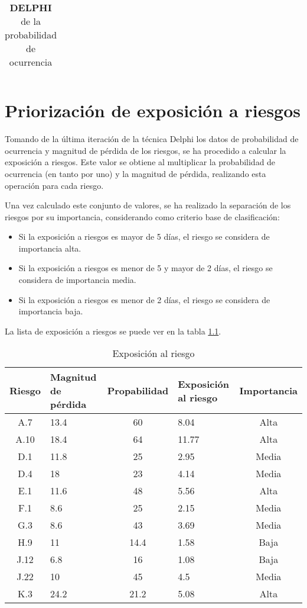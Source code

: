 \documentclass[11pt,a4paper,spanish,twoside]{report}
\begin{document}
\begin{table}[!h]
\begin{tabular}{|c|c||c|c|c|c|c||c|c|c||c|}
   \end{tabular}
  \caption{\textbf{DELPHI} de la probabilidad de ocurrencia}
  \label{Tab:DELPHIpro}
\end{table}


\chapter{Priorización de exposición a riesgos}
Tomando de la última iteración de la técnica Delphi los datos de probabilidad
de ocurrencia y magnitud de pérdida de los riesgos, se ha procedido a
calcular la exposición a riesgos. Este valor se obtiene al multiplicar la
probabilidad de ocurrencia (en tanto por uno) y la magnitud de pérdida,
realizando esta operación para cada riesgo.

Una vez calculado este conjunto de valores, se ha realizado la separación de
los riesgos por su importancia, considerando como criterio base de
clasificación:

\begin{itemize}
\item Si la exposición a riesgos es mayor de 5 días, el riesgo se considera de
importancia alta.
\item Si la exposición a riesgos es menor de 5 y mayor de 2 días, el riesgo se
considera de importancia media.
\item Si la exposición a riesgos es menor de 2 días, el riesgo se considera
de importancia baja.
\end{itemize}

La lista de exposición a riesgos se puede ver en la tabla \ref{Tab:Expri}.

\begin{table}[!h]
  \centering
  \begin{tabular}{|c||p{}||c||p{}||c|}
    \hline
    \textbf{Riesgo} & \textbf{Magnitud de pérdida} & \textbf{Propabilidad} & 
    \textbf{Exposición al riesgo} & \textbf{Importancia} \\
    \hline \hline
    A.7 & 13.4 & 60 & 8.04 & Alta \\ 
    \hline
    A.10 & 18.4 & 64 & 11.77 & Alta \\
    \hline 
    D.1 & 11.8 & 25 & 2.95 & Media \\
    \hline
    D.4 & 18 & 23 & 4.14 & Media \\
    \hline
    E.1 & 11.6 & 48 & 5.56 & Alta \\
    \hline
    F.1 & 8.6 & 25 & 2.15 & Media \\
    \hline
    G.3 & 8.6 & 43 & 3.69 & Media \\
    \hline
    H.9 & 11 & 14.4 & 1.58 & Baja \\
    \hline
    J.12 & 6.8 & 16 & 1.08 & Baja \\
    \hline
    J.22 & 10 & 45 & 4.5 & Media \\
    \hline
    K.3 & 24.2 & 21.2 & 5.08 & Alta \\
    \hline
  \end{tabular}
  \caption{Exposición al riesgo} 
  \label{Tab:Expri}
\end{table}
\end{document}
